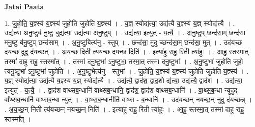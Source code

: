 \documentclass[17pt]{extarticle}
\begin{document}
\textbf{Jatai Paata} \newline

1. जु॒हो॒ति॒ य॒ज्ञ्स्य॑ य॒ज्ञ्स्य॑ जुहोति जुहोति य॒ज्ञ्स्य॑ । . य॒ज्ञ् स्योद्य॑त्या॒ उद्य॑त्यै य॒ज्ञ्स्य॑ य॒ज्ञ् स्योद्य॑त्यै । . उद्य॑त्या अनु॒ष्टुब॑ नु॒ष्टु बुद्य॑त्या॒ उद्य॑त्या अनु॒ष्टुप् । . उद्य॑त्या॒ इत्युत् - य॒त्यै॒ । . अ॒नु॒ष्टुप् छन्द॑सा॒म् छन्द॑सा मनु॒ष्टु ब॑नु॒ष्टुप् छन्द॑साम् । . अ॒नु॒ष्टुबित्य॑नु - स्तुप् । . छन्द॑सा॒ मुदु च्छन्द॑सा॒म् छन्द॑सा॒ मुत् । . उद॑यच्छ दयच्छ॒ दुदु द॑यच्छत् । . अ॒य॒च्छ॒ दिती त्य॑यच्छ दयच्छ॒ दिति॑ । . इत्या॑हु राहु॒ रिती त्या॑हुः । . आ॒हु॒ स्तस्मा॒त् तस्मा॑ दाहु राहु॒ स्तस्मा᳚त् । . तस्मा॑ दनु॒ष्टुभा॑ ऽनु॒ष्टुभा॒ तस्मा॒त् तस्मा॑ दनु॒ष्टुभा᳚ । . अ॒नु॒ष्टुभा॑ जुहोति जुहो त्यनु॒ष्टुभा॑ ऽनु॒ष्टुभा॑ जुहोति । . अ॒नु॒ष्टुभेत्य॑नु - स्तुभा᳚ । . जु॒हो॒ति॒ य॒ज्ञ्स्य॑ य॒ज्ञ्स्य॑ जुहोति जुहोति य॒ज्ञ्स्य॑ । . य॒ज्ञ् स्योद्य॑त्या॒ उद्य॑त्यै य॒ज्ञ्स्य॑ य॒ज्ञ् स्योद्य॑त्यै । . उद्य॑त्यै॒ द्वाद॑श॒ द्वाद॒शो द्य॑त्या॒ उद्य॑त्यै॒ द्वाद॑श । . उद्य॑त्या॒ इत्युत् - य॒त्यै॒ । . द्वाद॑श वाथ्सब॒न्धानि॑ वाथ्सब॒न्धानि॒ द्वाद॑श॒ द्वाद॑श वाथ्सब॒न्धानि॑ । . वा॒थ्स॒ब॒न्धा न्युदुद् वा᳚थ्सब॒न्धानि॑ वाथ्सब॒न्धा न्युत् । . वा॒थ्स॒ब॒न्धानीति॑ वाथ्स - ब॒न्धानि॑ । . उद॑यच्छन् नयच्छ॒न् नुदु द॑यच्छन्न् । . अ॒य॒च्छ॒न् निती त्य॑यच्छन् नयच्छ॒न् निति॑ । . इत्या॑हु राहु॒ रिती त्या॑हुः । . आ॒हु॒ स्तस्मा॒त् तस्मा॑ दाहु राहु॒ स्तस्मा᳚त् । \newline
\end{document}
